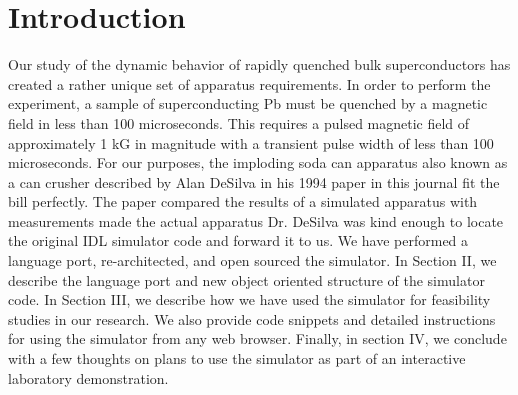 \documentclass[prb,preprint]{revtex4-1}
\begin{document}
\section{Introduction} %

Our study of the dynamic behavior of rapidly quenched bulk superconductors has created a rather unique set of apparatus requirements.  In order to perform the experiment, a sample of superconducting Pb must be quenched by a magnetic field in less than 100 microseconds.  This requires a pulsed magnetic field of approximately 1 kG in magnitude with a transient pulse width of less than 100 microseconds.  For our purposes, the imploding soda can apparatus \textemdash also known as a can crusher \textemdash described by Alan DeSilva in his 1994 paper\cite{desilvacan} in this journal fit the bill perfectly.  The paper compared the results of a simulated apparatus with measurements made the actual apparatus  Dr. DeSilva was kind enough to locate the original IDL simulator code and forward it to us.  We have performed a language port, re-architected, and open sourced the simulator.  In Section II, we describe the language port and new object oriented structure of the simulator code.  In Section III, we describe how we have used the simulator for feasibility studies in our research.  We also provide code snippets and detailed instructions for using the simulator from any web browser.  Finally, in section IV, we conclude with a few thoughts on plans to use the simulator as part of an interactive laboratory demonstration.
\\
\\
\end{document}
